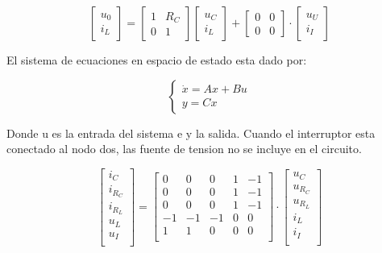 \begin{equation}
    \begin{bmatrix}
        u_0\\
        i_L
    \end{bmatrix}
    =
    \begin{bmatrix}
        1 & R_C\\
        0 & 1
    \end{bmatrix}
    \begin{bmatrix}
        u_C\\
        i_L
    \end{bmatrix}
    +
    \begin{bmatrix}
        0 & 0\\
        0 & 0
    \end{bmatrix}
    \cdot
    \begin{bmatrix}
        u_U\\
        i_I
    \end{bmatrix}
\end{equation}

El sistema de ecuaciones en espacio de estado esta dado por:

\begin{equation}
    \begin{cases}
    \dot{x} = Ax + Bu \\
    y = Cx
    \end{cases}
\end{equation}

Donde u es la entrada del sistema e y la salida.
Cuando el interruptor esta conectado al nodo dos, las fuente de tension 
no se incluye en el circuito.

\begin{equation}
    \begin{bmatrix}
        i_C\\
        i_{R_C}\\
        i_{R_L}\\
        u_L\\
        u_I\\
    \end{bmatrix}
    =
    \begin{bmatrix}
        0 & 0 & 0 & 1 & -1\\
        0 & 0 & 0 & 1 & -1\\
        0 & 0 & 0 & 1 & -1\\
        -1 & -1 & -1 & 0 & 0\\
        1 & 1 & 0 & 0 & 0\\
    \end{bmatrix}
    \cdot
    \begin{bmatrix}
        u_C\\
        u_{R_C}\\
        u_{R_L}\\
        i_L\\
        i_I\\
    \end{bmatrix}
\end{equation}

